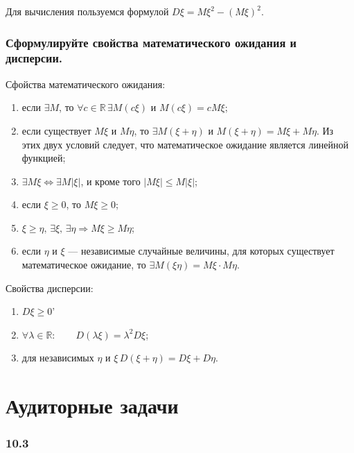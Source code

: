 Для вычисления пользуемся формулой $D \xi = M \xi^2 - \left( M \xi \right)^2.$

\subsubsection*{Сформулируйте свойства математического ожидания и дисперсии.}

Сфойства математического ожидания:
\begin{enumerate}
\item если $ \exists M$, то $ \forall c \in \mathbb{R} \, \exists M \left( c \xi \right) $ и $ M \left( c \xi \right) = cM \xi $;
\item если существует $M \xi $ и $M \eta $, то $ \exists M \left( \xi + \eta \right) $ и $M \left( \xi + \eta \right) = M \xi + M \eta $.
Из этих двух условий следует, что математическое ожидание является линейной функцией;
\item $ \exists M \xi \iff \exists M \left| \xi \right| $, и кроме того $ \left| M \xi \right| \leq M \left| \xi \right| $;
\item если $ \xi \geq 0$, то $M \xi \geq 0$;
\item $\xi \geq \eta, \, \exists \xi, \, \exists \eta \Rightarrow M \xi \geq M \eta $;
\item если $ \eta $ и $ \xi $ --- независимые случайные величины,
для которых существует математическое ожидание, то $ \exists M \left( \xi \eta \right) = M \xi \cdot M \eta $.
\end{enumerate}

Свойства дисперсии:
\begin{enumerate}
\item $D \xi \geq 0$'
\item $ \forall \lambda \in \mathbb{R}: \qquad D \left( \lambda \xi \right) = \lambda^2 D \xi $;
\item для независимых $ \eta $ и $ \xi \, D \left( \xi + \eta \right) = D \xi + D \eta $.
\end{enumerate}

\section*{Аудиторные задачи}

\subsubsection*{10.3}


